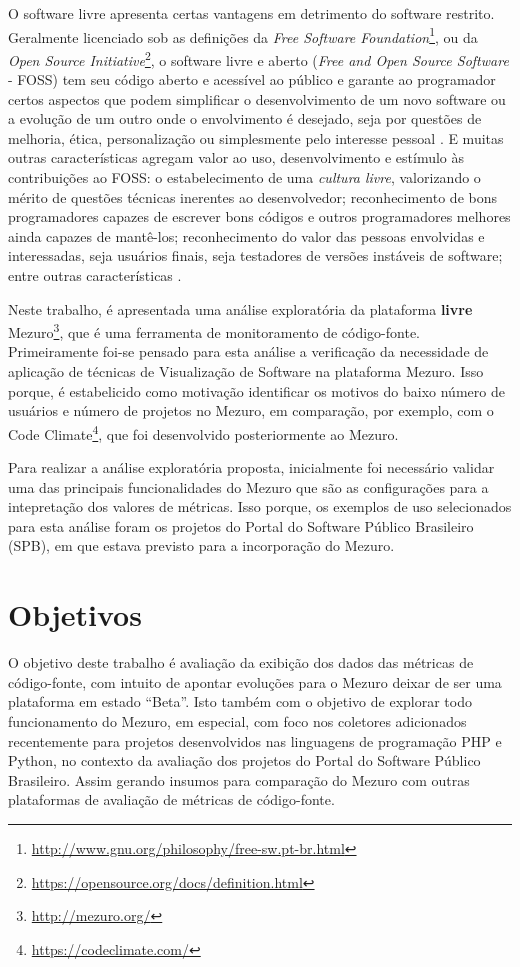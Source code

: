 O software livre apresenta certas vantagens em detrimento do software restrito.
Geralmente licenciado sob as definições da
\textit{Free Software Foundation}\footnote{\url{http://www.gnu.org/philosophy/free-sw.pt-br.html}},
ou da \textit{Open Source Initiative}\footnote{\url{https://opensource.org/docs/definition.html}},
o software livre e aberto (\textit{Free and Open Source Software} - FOSS) tem
seu código aberto e acessível ao público e garante ao programador certos
aspectos que podem simplificar o desenvolvimento de um novo software ou a
evolução de um outro onde o envolvimento é desejado, seja por questões de
melhoria, ética, personalização ou simplesmente pelo interesse pessoal
\cite{meirelles2013monitoramento}. E muitas outras características agregam
valor ao uso, desenvolvimento e estímulo às contribuições ao FOSS: o
estabelecimento de uma \textit{cultura livre}, valorizando o mérito de questões
técnicas inerentes ao desenvolvedor; reconhecimento de bons programadores
capazes de escrever bons códigos e outros programadores melhores ainda capazes de
mantê-los; reconhecimento do valor das pessoas envolvidas e interessadas, seja
usuários finais, seja testadores de versões instáveis de software; entre outras
características \cite{raymond1999cathedral}.

Neste trabalho, é apresentada uma análise exploratória da plataforma \textbf{livre}
Mezuro\footnote{\url{http://mezuro.org/}}, que é uma ferramenta de monitoramento
de código-fonte. Primeiramente foi-se pensado para esta análise a verificação da
necessidade de aplicação de técnicas de Visualização de Software na plataforma
Mezuro. Isso porque, é estabelicido como motivação identificar os motivos do
baixo número de usuários e número de projetos no Mezuro, em comparação, por
exemplo, com o Code Climate\footnote{\url{https://codeclimate.com/}}, que foi
desenvolvido posteriormente ao Mezuro.

Para realizar a análise exploratória proposta, inicialmente foi necessário
validar uma das principais funcionalidades do Mezuro que são as configurações
para a intepretação dos valores de métricas. Isso porque, os exemplos de uso
selecionados para esta análise foram os projetos do Portal do Software
Público Brasileiro (SPB), em que estava previsto para a incorporação do Mezuro.

\section{Objetivos}

O objetivo deste trabalho é avaliação da exibição dos dados das métricas de
código-fonte, com intuito de apontar evoluções para o Mezuro deixar de ser uma
plataforma em estado ``Beta''.
%
Isto também com o objetivo de explorar todo funcionamento do Mezuro, em especial,
com foco nos coletores adicionados recentemente para projetos desenvolvidos nas
linguagens de programação PHP e Python, no contexto da avaliação dos projetos do
Portal do Software Público Brasileiro.
%
Assim gerando insumos para comparação do Mezuro com outras plataformas de
avaliação de métricas de código-fonte.

